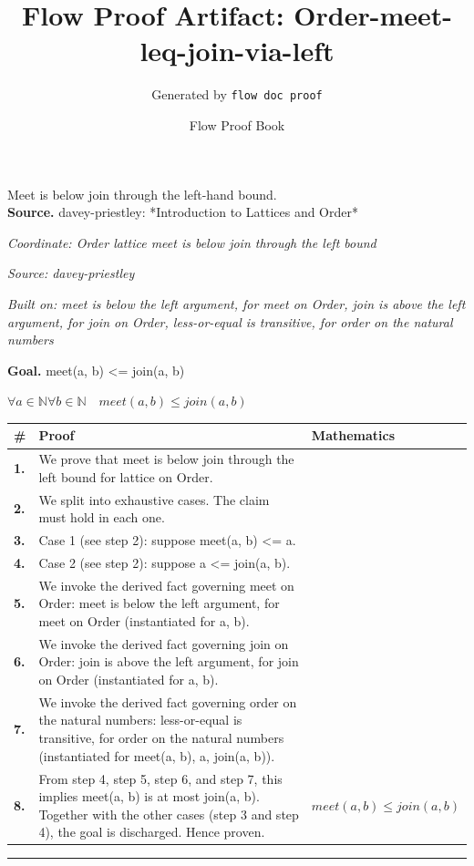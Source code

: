 \documentclass[11pt]{article}
\title{Flow Proof Artifact: Order-meet-leq-join-via-left}
\author{Generated by \texttt{flow doc proof}}
\date{Flow Proof Book}
\theoremstyle{definition}
\begin{document}
\maketitle
Meet is below join through the left-hand bound.\\[0.5em]
\textbf{Source.} davey-priestley: *Introduction to Lattices and Order*\\[0.5em]
\bigskip
{}\par
\smallskip\noindent\textit{Coordinate: Order \cdot lattice \cdot meet is below join through the left bound}\par
\smallskip\noindent\textit{Source: davey-priestley}\par
\smallskip\noindent\textit{Built on: meet is below the left argument, for meet on Order, join is above the left argument, for join on Order, less-or-equal is transitive, for order on the natural numbers}\par
\medskip
\noindent\textbf{Goal.} meet(a, b) <= join(a, b)\par
\noindent$\displaystyle \forall a \in \mathbb{N} \forall b \in \mathbb{N}\quad meet(a, b) \le join(a, b)$\par
\medskip
\noindent
\begin{tabular}{@{} >{\raggedright\arraybackslash}p{} >{\raggedright\arraybackslash}p{} >{\raggedleft\arraybackslash}p{} @{}}
\textbf{\#} & \textbf{Proof} & \textbf{Mathematics} \\
\midrule
\textbf{1.} & We prove that meet is below join through the left bound for lattice on Order. & \\[0.45em]
\textbf{2.} & We split into exhaustive cases. The claim must hold in each one. & \\[0.45em]
\textbf{3.} & Case 1 (see step 2): suppose meet(a, b) <= a. & \\[0.45em]
\textbf{4.} & Case 2 (see step 2): suppose a <= join(a, b). & \\[0.45em]
\textbf{5.} & We invoke the derived fact governing meet on Order: meet is below the left argument, for meet on Order (instantiated for a, b). & \\[0.45em]
\textbf{6.} & We invoke the derived fact governing join on Order: join is above the left argument, for join on Order (instantiated for a, b). & \\[0.45em]
\textbf{7.} & We invoke the derived fact governing order on the natural numbers: less-or-equal is transitive, for order on the natural numbers (instantiated for meet(a, b), a, join(a, b)). & \\[0.45em]
\textbf{8.} & From step 4, step 5, step 6, and step 7, this implies meet(a, b) is at most join(a, b). Together with the other cases (step 3 and step 4), the goal is discharged. Hence proven. & $\displaystyle meet(a, b) \le join(a, b)$ \\[0.45em]
\bottomrule
\end{tabular}
\label{thm:Order-lattice-meet_is_below_join_through_the_left_bound}
\par\medskip\hrule
\end{document}
